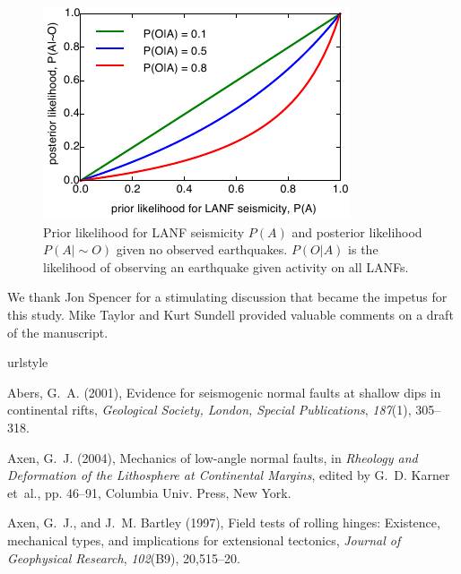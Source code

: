 \documentclass[twocolumn,grl]{AGUTeX}
\begin{document}
\begin{article}
\begin{figure}%
 \noindent\includegraphics{./figures/posteriors.pdf}
 \caption{Prior likelihood for LANF seismicity $P(A)$ and posterior
 likelihood $P(A|\sim O)$ given no observed earthquakes.  
 $P(O|A)$ is the likelihood of observing an earthquake given activity
 on all LANFs.}
 \label{fig:posteriors}
\end{figure}

\begin{acknowledgements}
  We thank Jon Spencer for a stimulating discussion that became the impetus for
  this study.  Mike Taylor and Kurt Sundell provided valuable comments on
  a draft of the manuscript. 
 
\end{acknowledgements}

\begin{thebibliography}{30}
\providecommand{\natexlab}[1]{#1}
\expandafter\ifx\csname urlstyle\endcsname\relax
  \providecommand{\doi}[1]{doi:\discretionary{}{}{}#1}\else
  \providecommand{\doi}{doi:\discretionary{}{}{}\begingroup
  \urlstyle{rm}\Url}\fi

Abers, G.~A. (2001), Evidence for seismogenic normal faults at shallow dips in
  continental rifts, \textit{Geological Society, London, Special Publications},
  \textit{187}(1), 305--318.

Axen, G.~J. (2004), Mechanics of low-angle normal faults, in \textit{Rheology
  and Deformation of the Lithosphere at Continental Margins}, edited by G.~D.
  Karner et~al., pp. 46--91, Columbia Univ. Press, New York.

Axen, G.~J., and J.~M. Bartley (1997), Field tests of rolling hinges:
  Existence, mechanical types, and implications for extensional tectonics,
  \textit{Journal of Geophysical Research}, \textit{102}(B9), 20,515--20.


\end{thebibliography}
\end{article}
\end{document}
